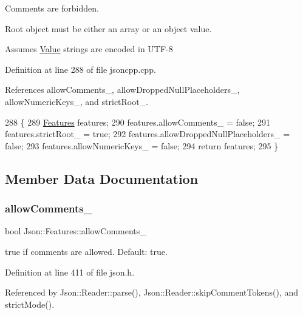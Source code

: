 \begin{DoxyItemize}
\item Comments are forbidden.
\item Root object must be either an array or an object value.
\item Assumes \hyperlink{class_json_1_1_value}{Value} strings are encoded in U\+T\+F-\/8 
\end{DoxyItemize}

Definition at line 288 of file jsoncpp.\+cpp.



References allow\+Comments\+\_\+, allow\+Dropped\+Null\+Placeholders\+\_\+, allow\+Numeric\+Keys\+\_\+, and strict\+Root\+\_\+.


\begin{DoxyCode}
288                               \{
289   \hyperlink{class_json_1_1_features_ad15a091cb61bb31323299a95970d2644}{Features} features;
290   features.allowComments\_ = \textcolor{keyword}{false};
291   features.strictRoot\_ = \textcolor{keyword}{true};
292   features.allowDroppedNullPlaceholders\_ = \textcolor{keyword}{false};
293   features.allowNumericKeys\_ = \textcolor{keyword}{false};
294   \textcolor{keywordflow}{return} features;
295 \}
\end{DoxyCode}


\subsection{Member Data Documentation}
\mbox{\label{class_json_1_1_features_a33afd389719624b6bdb23950b3c346c9}} 
\subsubsection{\texorpdfstring{allow\+Comments\+\_\+}{allowComments\_}}
{\footnotesize\ttfamily bool Json\+::\+Features\+::allow\+Comments\+\_\+}



{\ttfamily true} if comments are allowed. Default\+: {\ttfamily true}. 



Definition at line 411 of file json.\+h.



Referenced by Json\+::\+Reader\+::parse(), Json\+::\+Reader\+::skip\+Comment\+Tokens(), and strict\+Mode().

